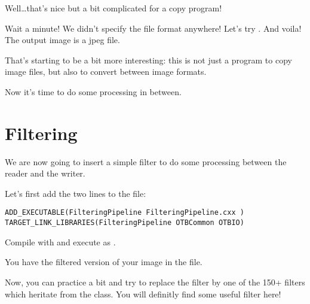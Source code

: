 Well\ldots that's nice but a bit complicated for a copy program!

Wait a minute! We didn't specify the file format anywhere! Let's try . And voila! The output image is a jpeg file. 

That's starting to be a bit more interesting: this is not just a program to copy image files, but also to convert between image formats.

Now it's time to do some processing in between.


\section{Filtering}
\label{sec:TutorialFiltering}


We are now going to insert a simple filter to do some processing between the reader and the writer.

Let's first add the two lines to the  file:

\small
\begin{verbatim}
ADD_EXECUTABLE(FilteringPipeline FilteringPipeline.cxx )
TARGET_LINK_LIBRARIES(FilteringPipeline OTBCommon OTBIO)
\end{verbatim}



Compile with  and execute as .
 
You have the filtered version of your image in the  file.

Now, you can practice a bit and try to replace the filter by one of the 150+ filters which heritate from the  class. You will definitly find some useful filter here!



% 
% 
% 
% 
% 
% 
% 



